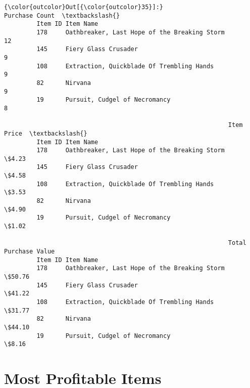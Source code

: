 \documentclass[11pt]{article}
\begin{document}
\begin{Verbatim}[commandchars=\\\{\}]
{\color{outcolor}Out[{\color{outcolor}35}]:}                                                       Purchase Count  \textbackslash{}
         Item ID Item Name                                                      
         178     Oathbreaker, Last Hope of the Breaking Storm              12   
         145     Fiery Glass Crusader                                       9   
         108     Extraction, Quickblade Of Trembling Hands                  9   
         82      Nirvana                                                    9   
         19      Pursuit, Cudgel of Necromancy                              8   
         
                                                              Item Price  \textbackslash{}
         Item ID Item Name                                                 
         178     Oathbreaker, Last Hope of the Breaking Storm      \$4.23   
         145     Fiery Glass Crusader                              \$4.58   
         108     Extraction, Quickblade Of Trembling Hands         \$3.53   
         82      Nirvana                                           \$4.90   
         19      Pursuit, Cudgel of Necromancy                     \$1.02   
         
                                                              Total Purchase Value  
         Item ID Item Name                                                          
         178     Oathbreaker, Last Hope of the Breaking Storm               \$50.76  
         145     Fiery Glass Crusader                                       \$41.22  
         108     Extraction, Quickblade Of Trembling Hands                  \$31.77  
         82      Nirvana                                                    \$44.10  
         19      Pursuit, Cudgel of Necromancy                               \$8.16  
\end{Verbatim}
            
    \section{Most Profitable Items}\label{most-profitable-items}
\end{document}
